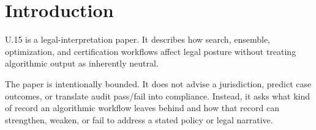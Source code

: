 \section{Introduction}

U.15 is a legal-interpretation paper. It describes how search, ensemble,
optimization, and certification workflows affect legal posture without treating
algorithmic output as inherently neutral.

The paper is intentionally bounded. It does not advise a jurisdiction, predict
case outcomes, or translate audit pass/fail into compliance. Instead, it asks
what kind of record an algorithmic workflow leaves behind and how that record
can strengthen, weaken, or fail to address a stated policy or legal narrative.

